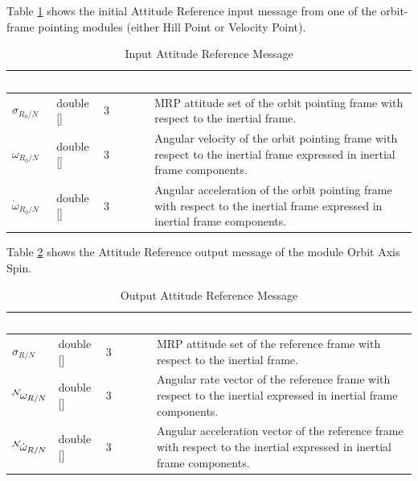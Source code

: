 \documentclass[]{AVSSimReportMemo}
\begin{document}
Table \ref{tab:inputRefTable} shows the initial Attitude Reference input message from one of the orbit-frame pointing modules (either Hill Point or Velocity Point).
\begin{table}[h!]
	\centering
	\caption{Input Attitude Reference Message}
	\begin{tabular}{|l|l|l|p{3in}|}
		\hline
		\rowcolor{BrickRed}
		\textcolor{white}{Name} & \textcolor{white}{Type} & 
		\textcolor{white}{Length} & 
		\textcolor{white}{Description}  \\ \hline
		$\sigma_{R_0/N}$ & double [] & 3 & 
		MRP attitude set of the orbit pointing frame with respect to the inertial frame. \\ \hline
		$\omega_{R_0/N}$ & double [] & 3 & 
		Angular velocity of the orbit pointing frame with respect to the inertial frame expressed in inertial frame components. \\ \hline
		$\dot{\omega}_{R_0/N}$ & double [] & 3 & 
		Angular acceleration of the orbit pointing frame with respect to the inertial frame expressed in inertial frame components. \\ \hline
	\end{tabular}
	\label{tab:inputRefTable}
\end{table}

Table \ref{tab:outputTable} shows the Attitude Reference output message of the module Orbit Axis Spin.
\begin{table}[h!]
	\centering
	\caption{Output Attitude Reference Message}
	\begin{tabular}{|l|l|l|p{3in}|}
		\hline
		\rowcolor{BrickRed}
		\textcolor{white}{Name} & \textcolor{white}{Type} & 
		\textcolor{white}{Length} & 
		\textcolor{white}{Description}  \\ \hline
		$\sigma_{R/N}$ & double [] & 3 & 
		MRP attitude set of the reference frame with respect to the inertial frame. \\ \hline
		$\leftexp{N} \omega_{R/N}$ & double [] & 3 & 
		Angular rate vector of the reference frame with respect to the inertial expressed in inertial frame components. \\ \hline
		$\leftexp{N} {\dot{\omega}_{R/N}}$ & double [] & 3 & 
		Angular acceleration vector of the reference frame with respect to the inertial expressed in inertial frame components. \\ \hline
	\end{tabular}
	\label{tab:outputTable}
\end{table}
\newpage
\end{document}
